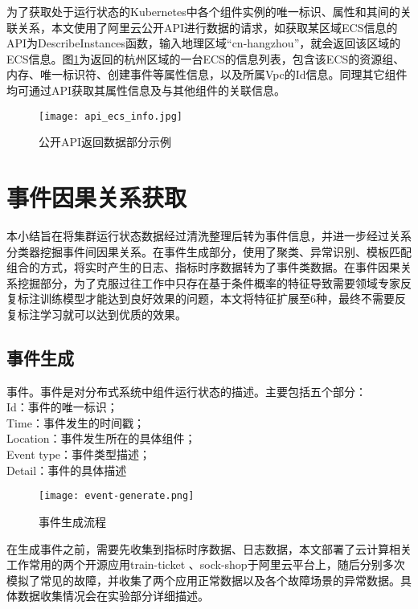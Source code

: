 为了获取处于运行状态的Kubernetes中各个组件实例的唯一标识、属性和其间的关联关系，本文使用了阿里云公开API进行数据的请求，如获取某区域ECS信息的API为DescribeInstances函数，输入地理区域“cn-hangzhou”，就会返回该区域的ECS信息。图\ref{api_ecs_info}为返回的杭州区域的一台ECS的信息列表，包含该ECS的资源组、内存、唯一标识符、创建事件等属性信息，以及所属Vpc的Id信息。同理其它组件均可通过API获取其属性信息及与其他组件的关联信息。
\begin{figure}[htbp]
    \centering
    \texttt{[image: api\_ecs\_info.jpg]}
    \caption{公开API返回数据部分示例\label{api_ecs_info}}
\end{figure}

\section{事件因果关系获取}
本小结旨在将集群运行状态数据经过清洗整理后转为事件信息，并进一步经过关系分类器挖掘事件间因果关系。在事件生成部分，使用了聚类、异常识别、模板匹配组合的方式，将实时产生的日志、指标时序数据转为了事件类数据。在事件因果关系挖掘部分，为了克服过往工作中只存在基于条件概率的特征导致需要领域专家反复标注训练模型才能达到良好效果的问题，本文将特征扩展至6种，最终不需要反复标注学习就可以达到优质的效果。
\subsection{事件生成}
\begin{definition}[事件]
    事件。事件是对分布式系统中组件运行状态的描述。主要包括五个部分：
    {\\\qquad
        Id：事件的唯一标识；\\
        Time：事件发生的时间戳；\\\qquad
        Location：事件发生所在的具体组件；\\\qquad
        Event type：事件类型描述；\\\qquad
        Detail：事件的具体描述\\\qquad
    }
\end{definition}
\begin{figure}[htbp]
    \centering
    \texttt{[image: event-generate.png]}
    \caption{事件生成流程\label{event-generate}}
\end{figure}

在生成事件之前，需要先收集到指标时序数据、日志数据，本文部署了云计算相关工作常用的两个开源应用train-ticket\cite{zhou2018poster} 、sock-shop\cite{rahman2019predicting}于阿里云平台上，随后分别多次模拟了常见的故障，并收集了两个应用正常数据以及各个故障场景的异常数据。具体数据收集情况会在实验部分详细描述。

